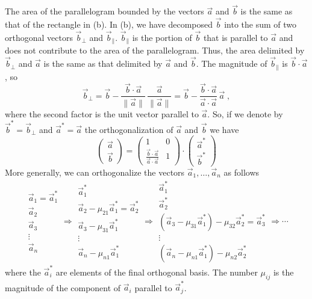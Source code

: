 The area of the parallelogram bounded by the vectors $\vec{a}$ and
$\vec{b}$ is the same as that of the rectangle in
(b).  In (b), we
have decomposed $\vec{b}$ into the sum of two orthogonal vectors
$\vec{b}_{\perp}$ and $\vec{b}_{\parallel}$.  $\vec{b}_{\parallel}$ is
the portion of $\vec{b}$ that is parallel to $\vec{a}$ and does not
contribute to the area of the parallelogram.  Thus, the area delimited
by $\vec{b}_{\perp}$ and $\vec{a}$ is the same as that
delimited by $\vec{a}$ and $\vec{b}$.  The magnitude of
$\vec{b}_{\parallel}$ is $\vec{b} \cdot \vec{a}$, so 
\[
\vec{b}_{\perp} = \vec{b} - \frac{\vec{b} \cdot \vec{a}}{\|\vec{a}\|} \,
\frac{\vec{a}}{\|\vec{a}\|} = 
\vec{b} - \frac{\vec{b} \cdot \vec{a}}{\vec{a} \cdot \vec{a}}\,
\vec{a}\;,
\]
where the second factor is the unit vector parallel to $\vec{a}$.
So, if we denote by $\vec{b}^{\ast} = \vec{b}_{\perp}$ and
$\vec{a}^{\ast} = \vec{a}$ the orthogonalization of $\vec{a}$ and
$\vec{b}$ we have
\[
\left(\begin{array}{c} \vec{a} \\ \vec{b} \end{array}\right)
= 
\left(\begin{array}{cc} 1 & 0 \\ 
\frac{\vec{b} \cdot \vec{a}}{\vec{a} \cdot \vec{a}} & 1 \end{array}\right)
\cdot
\left(\begin{array}{c} \vec{a}^{\ast} \\ \vec{b}^\ast \end{array}
\right)
\]
More generally, we can orthogonalize the vectors $\vec{a}_1, \ldots,
\vec{a}_n$ as follows
\[
\begin{array}{l} \vec{a}_1 = \vec{a}^{\ast}_1 \\ \vec{a}_2 \\ \vec{a}_3 \\ \vdots \\ \vec{a}_n \end{array}
\Rightarrow
\begin{array}{l} \vec{a}^{\ast}_1 \\ 
   \vec{a}_2 -\mu_{21} \vec{a}^{\ast}_1 = \vec{a}^{\ast}_2 \\
   \vec{a}_3 - \mu_{31} \vec{a}^{\ast}_1\\ \vdots \\ \vec{a}_n -\mu_{n1} \vec{a}^{\ast}_1
\end{array}
\Rightarrow
\begin{array}{l} \vec{a}^{\ast}_1 \\ 
   \vec{a}^{\ast}_2 \\ 
   (\vec{a}_3 - \mu_{31} \vec{a}^{\ast}_1) - \mu_{32}\vec{a}^{\ast}_2 = \vec{a}^{\ast}_3 \\ 
   \vdots \\ (\vec{a}_n -\mu_{n1} \vec{a}^{\ast}_1)  - \mu_{n2}\vec{a}^{\ast}_2 
\end{array}
\Rightarrow
\cdots
\]
where the $\vec{a}^{\ast}_i$ are elements of the final orthogonal
basis.  The number $\mu_{ij}$ is the magnitude of the component of
$\vec{a}_i$ parallel to $\vec{a}^{\ast}_j$.

